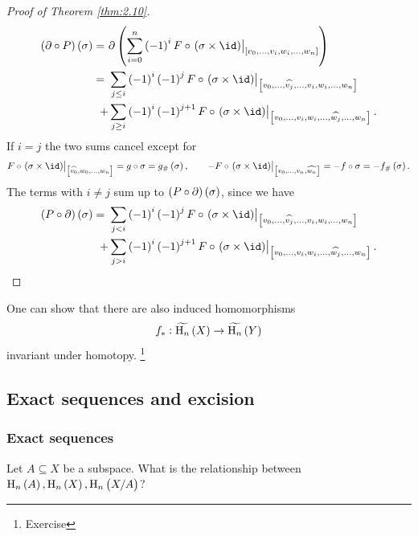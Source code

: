 \begin{proof}[Proof of Theorem \ref{thm:2.10}]
\begin{align*}
\br{\da \circ P}\br{\sigma}
= \ & \da\br{\sum_{i = 0}^n \br{-1}^iF \circ \eval{\br{\sigma \times \id}}_{\sbr{v_0, \dots, v_i, w_i, \dots, w_n}}} \\
= \ & \sum_{j \le i} \br{-1}^i\br{-1}^jF \circ \eval{\br{\sigma \times \id}}_{\sbr{v_0, \dots, \widehat{v_j}, \dots, v_i, w_i, \dots, w_n}} \\
+ & \sum_{j \ge i} \br{-1}^i\br{-1}^{j + 1}F \circ \eval{\br{\sigma \times \id}}_{\sbr{v_0, \dots, v_i, w_i, \dots, \widehat{w_j}, \dots, w_n}}.
\end{align*}
If $ i = j $ the two sums cancel except for
$$ F \circ \eval{\br{\sigma \times \id}}_{\sbr{\widehat{v_0}, w_0, \dots, w_n}} = g \circ \sigma = g_\#\br{\sigma}, \qquad -F \circ \eval{\br{\sigma \times \id}}_{\sbr{v_0, \dots, v_n, \widehat{w_n}}} = -f \circ \sigma = -f_\#\br{\sigma}. $$
The terms with $ i \ne j $ sum up to $ \br{P \circ \da}\br{\sigma} $, since we have
\begin{align*}
\br{P \circ \da}\br{\sigma}
= \ & \sum_{j < i} \br{-1}^i\br{-1}^jF \circ \eval{\br{\sigma \times \id}}_{\sbr{v_0, \dots, \widehat{v_j}, \dots, v_i, w_i, \dots, w_n}} \\
+ & \sum_{j > i} \br{-1}^i\br{-1}^{j + 1}F \circ \eval{\br{\sigma \times \id}}_{\sbr{v_0, \dots, v_i, w_i, \dots, \widehat{w_j}, \dots, w_n}}.
\end{align*}
\end{proof}


\begin{remark*}
One can show that there are also induced homomorphisms
$$ f_* : \widetilde{\H_n}\br{X} \to \widetilde{\H_n}\br{Y} $$
invariant under homotopy. \footnote{Exercise}
\end{remark*}

\pagebreak

\subsection{Exact sequences and excision}

\subsubsection{Exact sequences}

Let $ A \subseteq X $ be a subspace. What is the relationship between $ \H_n\br{A}, \H_n\br{X}, \H_n\br{X / A} $?

